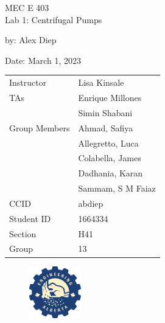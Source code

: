 \documentclass[letterpaper,11pt]{article} %
\begin{document}
\begin{titlepage}
    \centering
    \vspace*{2cm} %
    
    \Huge {MEC E 403 \\Lab 1: Centrifugal Pumps} \\
    \vspace{1cm} %
    
    \Large by: Alex Diep \\
    \vspace{1cm} %

    \Large Date: March 1, 2023 \\ %
    \vspace{2cm} %

    \begin{table}[h]
        \centering
        \begin{tabular}{ll}
            Instructor & Lisa Kinsale \\
            TAs & Enrique Millones \\
            & Simin Shabani \vspace{0.5cm} \\
            Group Members & Ahmad, Safiya \\
            & Allegretto, Luca \\
            & Colabella, James \\
            & Dadhania, Karan \\
            & Sammam, S M Faiaz \vspace{0.5cm} \\
            CCID & abdiep \\
            Student ID & 1664334 \\
            Section & H41 \\
            Group & 13 \\
        \end{tabular}
    \end{table}
    \begin{figure}[h]
        \centering
        \includegraphics[width=0.2\textwidth]{uofa_engineering_logo.png}
    \end{figure}
    \vfill %

    
\end{titlepage}
\renewcommand\arraystretch{1.5}
\end{document}
